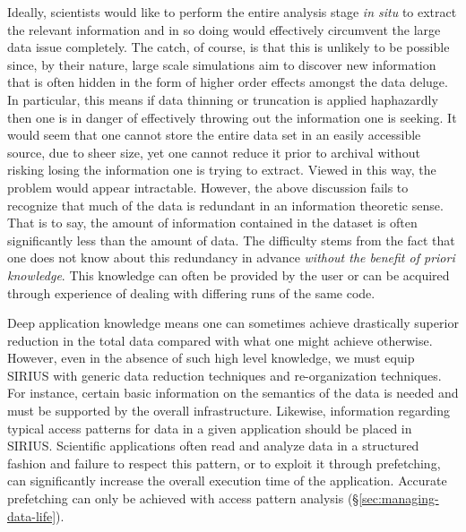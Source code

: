 Ideally, scientists would like to perform the entire analysis stage {\em in situ}
to extract the relevant information and in so doing would effectively
circumvent the large data issue completely.  The catch, of course, is that this
is unlikely to be possible since, by their nature, large scale simulations aim
to discover new information that is often hidden in the form of higher order
effects amongst the data deluge. In particular, this means if data thinning or
truncation is applied haphazardly then one is in danger of effectively throwing
out the information one is seeking. It would seem that one cannot store the
entire data set in an easily accessible source, due to sheer size, yet one
cannot reduce it prior to archival without risking losing the information one
is trying to extract.  Viewed in this way, the problem would appear
intractable. However, the above discussion fails to recognize that much of the
data is redundant in an information theoretic sense.  That is to say, the
amount of information contained in the dataset is often significantly less than
the amount of data.  The difficulty stems from the fact that one does not know
about this redundancy in advance \emph{without the benefit of priori
knowledge}. This knowledge can often be provided by the user or can be acquired
through experience of dealing with differing runs of the same code. 

Deep application knowledge means one can sometimes achieve drastically superior
reduction in the total data compared with what one might achieve otherwise.
However, even in the absence of such high level knowledge, we must equip SIRIUS with generic data reduction techniques and re-organization
techniques. For instance, certain basic information on the semantics of the
data is needed and must be supported by the overall infrastructure. Likewise,
information regarding typical access patterns for data in a given application
should be placed in SIRIUS. Scientific applications often read and
analyze data in a structured fashion and failure to respect this pattern, or to
exploit it through prefetching, can significantly increase the overall
execution time of the application. Accurate prefetching can only be achieved
with access pattern analysis (\S\ref{sec:managing-data-life}). 


